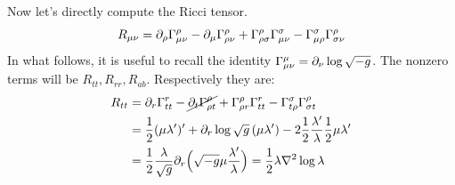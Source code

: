\documentclass[11pt, class=article, crop=false]{standalone}
\begin{document}
\begin{enumerate}
	Now let's directly compute the Ricci tensor.
	\[
		R_{\mu \nu} = \partial_{\rho} \Gamma^{\rho}_{\mu \nu} - \partial_\mu \Gamma^{\rho}_{\rho \nu} + \Gamma^{\rho}_{\rho \sigma} \Gamma^\sigma_{\mu \nu} - \Gamma_{\mu \rho}^\sigma \Gamma^\rho_{\sigma \nu}
	\]
	In what follows, it is useful to recall the identity $\Gamma^\mu_{\mu \nu} = \partial_\nu \log \sqrt{-g}$. 
	The nonzero terms will be $R_{tt}, R_{rr}, R_{ab}$. Respectively they are:
	\[
	\begin{aligned}
		R_{tt} &= \partial_{r} \Gamma^{r}_{tt} - \cancel{\partial_t \Gamma^{\rho}_{\rho t}} + \Gamma^{\rho}_{\rho r} \Gamma^r_{t t} - \Gamma_{t \rho}^\sigma \Gamma^\rho_{\sigma t}\\
		& = \frac12 (\mu \lambda' )' + \partial_r \log \sqrt{g} \, (\mu \lambda') - 2 \frac12 \frac{\lambda'}{\lambda} \frac12 \mu \lambda' \\
		&= \frac12 \frac{\lambda}{\sqrt g} \partial_r \Big(\sqrt{-g} \mu \frac{\lambda'}{\lambda} \Big) = \frac12 \lambda \nabla^2 \log \lambda
	\end{aligned}
	\]
	

\end{enumerate}
\end{document}
